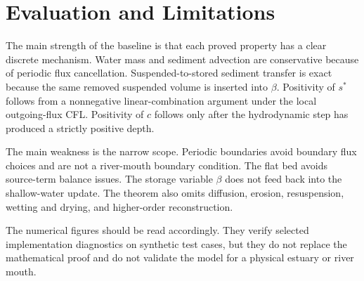 \section{Evaluation and Limitations}

The main strength of the baseline is that each proved property has a clear discrete mechanism. Water mass and sediment advection are conservative because of periodic flux cancellation. Suspended-to-stored sediment transfer is exact because the same removed suspended volume is inserted into \(\beta\). Positivity of \(s^*\) follows from a nonnegative linear-combination argument under the local outgoing-flux CFL. Positivity of \(c\) follows only after the hydrodynamic step has produced a strictly positive depth.

The main weakness is the narrow scope. Periodic boundaries avoid boundary flux choices and are not a river-mouth boundary condition. The flat bed avoids source-term balance issues. The storage variable \(\beta\) does not feed back into the shallow-water update. The theorem also omits diffusion, erosion, resuspension, wetting and drying, and higher-order reconstruction.

The numerical figures should be read accordingly. They verify selected implementation diagnostics on synthetic test cases, but they do not replace the mathematical proof and do not validate the model for a physical estuary or river mouth.
